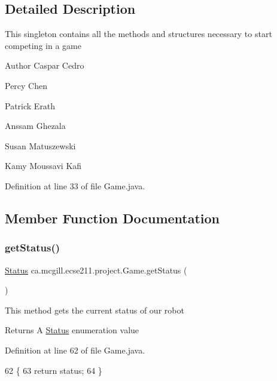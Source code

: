 \subsection{Detailed Description}
This singleton contains all the methods and structures necessary to start competing in a game

\begin{DoxyAuthor}{Author}
Caspar Cedro 

Percy Chen 

Patrick Erath 

Anssam Ghezala 

Susan Matuszewski 

Kamy Moussavi Kafi 
\end{DoxyAuthor}


Definition at line 33 of file Game.\+java.



\subsection{Member Function Documentation}
\mbox{\label{enumca_1_1mcgill_1_1ecse211_1_1project_1_1_game_a620374b3eeb3dd7e0abd26f3ced9053b}} 
\subsubsection{\texorpdfstring{get\+Status()}{getStatus()}}
{\footnotesize\ttfamily \hyperlink{enumca_1_1mcgill_1_1ecse211_1_1project_1_1_game_1_1_status}{Status} ca.\+mcgill.\+ecse211.\+project.\+Game.\+get\+Status (\begin{DoxyParamCaption}{ }\end{DoxyParamCaption})}

This method gets the current status of our robot

\begin{DoxyReturn}{Returns}
A \hyperlink{enumca_1_1mcgill_1_1ecse211_1_1project_1_1_game_1_1_status}{Status} enumeration value 
\end{DoxyReturn}


Definition at line 62 of file Game.\+java.


\begin{DoxyCode}
62                             \{
63     \textcolor{keywordflow}{return} status;
64   \}
\end{DoxyCode}
\mbox{\label{enumca_1_1mcgill_1_1ecse211_1_1project_1_1_game_a43a5763d183e0bcacd402c872c07273e}} 
